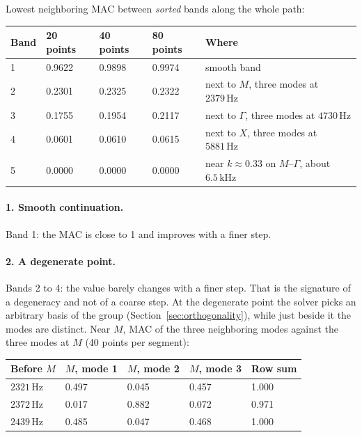 Lowest neighboring MAC between \emph{sorted} bands along the whole path:

\begin{center}
\begin{tabular}{|l|l|l|l|p{}|}
\hline
Band & 20 points & 40 points & 80 points & Where \\
\hline
1 & 0.9622 & 0.9898 & 0.9974 & smooth band \\
2 & 0.2301 & 0.2325 & 0.2322 & next to $M$, three modes at $2379\,\mathrm{Hz}$ \\
3 & 0.1755 & 0.1954 & 0.2117 & next to $\Gamma$, three modes at $4730\,\mathrm{Hz}$ \\
4 & 0.0601 & 0.0610 & 0.0615 & next to $X$, three modes at $5881\,\mathrm{Hz}$ \\
5 & 0.0000 & 0.0000 & 0.0000 & near $k \approx 0.33$ on $M$--$\Gamma$, about $6.5\,\mathrm{kHz}$ \\
\hline
\end{tabular}
\end{center}

\paragraph{1. Smooth continuation.} Band 1: the MAC is close to 1 and improves with a
finer step.

\paragraph{2. A degenerate point.} Bands 2 to 4: the value barely changes with a finer
step. That is the signature of a degeneracy and not of a coarse step. At the
degenerate point the solver picks an arbitrary basis of the group
(Section~\ref{sec:orthogonality}), while just beside it the modes are distinct. Near
$M$, MAC of the three neighboring modes against the three modes at $M$ (40 points per
segment):

\begin{center}
\begin{tabular}{|l|l|l|l|l|}
\hline
Before $M$ & $M$, mode 1 & $M$, mode 2 & $M$, mode 3 & Row sum \\
\hline
$2321\,\mathrm{Hz}$ & 0.497 & 0.045 & 0.457 & 1.000 \\
$2372\,\mathrm{Hz}$ & 0.017 & 0.882 & 0.072 & 0.971 \\
$2439\,\mathrm{Hz}$ & 0.485 & 0.047 & 0.468 & 1.000 \\
\hline
\end{tabular}
\end{center}

